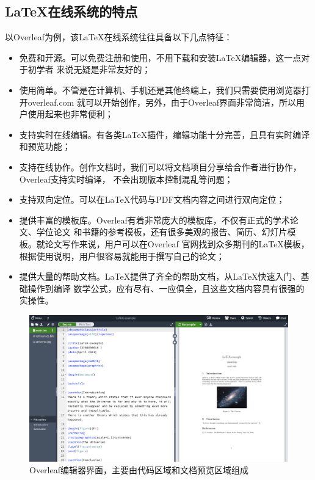 \subsection{\LaTeX 在线系统的特点}
以Overleaf为例，该LaTeX在线系统往往具备以下几点特征：
\begin{itemize}
      \item 免费和开源。可以免费注册和使用，不用下载和安装LaTeX编辑器，这一点对于初学者
            来说无疑是非常友好的；
      \item 使用简单。不管是在计算机、手机还是其他终端上，我们只需要使用浏览器打开overleaf.com
            就可以开始创作，另外，由于Overleaf界面非常简洁，所以用户使用起来也非常便利；
      \item 支持实时在线编辑。有各类LaTeX插件，编辑功能十分完善，且具有实时编译和预览功能；
      \item 支持在线协作。创作文档时，我们可以将文档项目分享给合作者进行协作，Overleaf支持实时编译，
            不会出现版本控制混乱等问题；
      \item 支持双向定位。可以在LaTeX代码与PDF文档内容之间进行双向定位；
      \item 提供丰富的模板库。Overleaf有着非常庞大的模板库，不仅有正式的学术论文、学位论文
            和书籍的参考模板，还有很多美观的报告、简历、幻灯片模板。就论文写作来说，用户可以在Overleaf
            官网找到众多期刊的LaTeX模板，根据使用说明，用户很容易就能用于撰写自己的论文；
      \item 提供大量的帮助文档。LaTeX提供了齐全的帮助文档，从LaTeX快速入门、基础操作到编译
            数学公式，应有尽有、一应俱全，且这些文档内容具有很强的实操性。
\end{itemize}

\begin{figure}
      \centering
      \includegraphics[width=\textwidth]{images/overleaf_example.png}
      \caption{Overleaf编辑器界面，主要由代码区域和文档预览区域组成}
\end{figure}

